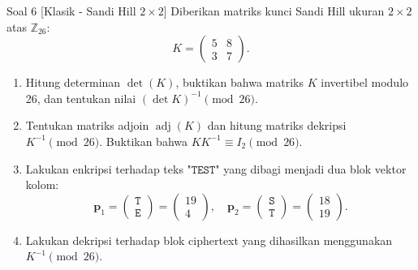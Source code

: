 \documentclass[11pt,a4paper]{article}
\begin{document}

\begin{soalklasik}{Soal 6 [Klasik - Sandi Hill $2 \times 2$]}
Diberikan matriks kunci Sandi Hill ukuran $2 \times 2$ atas $\mathbb{Z}_{26}$:
\[
K = \begin{pmatrix} 5 & 8 \\ 3 & 7 \end{pmatrix}.
\]
\begin{enumerate}[label=(\alph*)]
    \item Hitung determinan $\det(K)$, buktikan bahwa matriks $K$ invertibel modulo 26, dan tentukan nilai $(\det K)^{-1} \pmod{26}$.
    \item Tentukan matriks adjoin $\operatorname{adj}(K)$ dan hitung matriks dekripsi $K^{-1} \pmod{26}$. Buktikan bahwa $K K^{-1} \equiv I_2 \pmod{26}$.
    \item Lakukan enkripsi terhadap teks $\texttt{"TEST"}$ yang dibagi menjadi dua blok vektor kolom:
    \[
    \mathbf{p}_1 = \begin{pmatrix} \texttt{T} \\ \texttt{E} \end{pmatrix} = \begin{pmatrix} 19 \\ 4 \end{pmatrix}, \quad \mathbf{p}_2 = \begin{pmatrix} \texttt{S} \\ \texttt{T} \end{pmatrix} = \begin{pmatrix} 18 \\ 19 \end{pmatrix}.
    \]
    \item Lakukan dekripsi terhadap blok ciphertext yang dihasilkan menggunakan $K^{-1} \pmod{26}$.
\end{enumerate}
\end{soalklasik}
\end{document}
